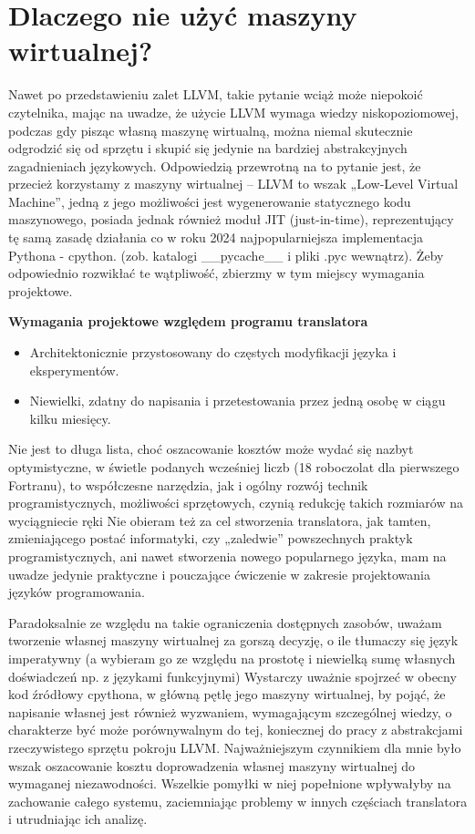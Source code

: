 \section{Dlaczego nie użyć maszyny wirtualnej?}
Nawet po przedstawieniu zalet LLVM, takie pytanie wciąż może niepokoić czytelnika, mając na uwadze, że użycie LLVM wymaga wiedzy niskopoziomowej, podczas gdy pisząc własną maszynę wirtualną, można niemal skutecznie odgrodzić się od sprzętu i skupić się jedynie na bardziej abstrakcyjnych zagadnieniach językowych. 
Odpowiedzią przewrotną na to pytanie jest, że przecież korzystamy z maszyny wirtualnej – LLVM to wszak „Low-Level Virtual Machine”, jedną z jego możliwości jest wygenerowanie statycznego kodu maszynowego, posiada jednak również moduł JIT (just-in-time), reprezentujący tę samą zasadę działania co w roku 2024 najpopularniejsza implementacja Pythona - cpython. (zob. katalogi \_\_pycache\_\_ i pliki .pyc wewnątrz). Żeby odpowiednio rozwikłać te wątpliwość, zbierzmy w tym miejscy wymagania projektowe.

\textbf{Wymagania projektowe względem programu translatora}
\begin{itemize}[noitemsep]
    \item Architektonicznie przystosowany do częstych modyfikacji języka i eksperymentów.%
    \item Niewielki, zdatny do napisania i przetestowania przez jedną osobę w ciągu kilku miesięcy.
\end{itemize}

Nie jest to długa lista, choć oszacowanie kosztów może wydać się nazbyt optymistyczne, w świetle podanych wcześniej liczb (18 roboczolat dla pierwszego Fortranu), to współczesne narzędzia, jak i ogólny rozwój technik programistycznych, możliwości sprzętowych, czynią redukcję takich rozmiarów na wyciągniecie ręki Nie obieram też za cel stworzenia translatora, jak tamten, zmieniającego postać informatyki, czy „zaledwie” powszechnych praktyk programistycznych, ani nawet stworzenia nowego popularnego języka, mam na uwadze jedynie praktyczne i pouczające ćwiczenie w zakresie projektowania języków programowania.

Paradoksalnie ze względu na takie ograniczenia dostępnych zasobów, uważam tworzenie własnej maszyny wirtualnej za gorszą decyzję, o ile tłumaczy się język imperatywny (a wybieram go ze względu na prostotę i niewielką sumę własnych doświadczeń np. z językami funkcyjnymi) Wystarczy uważnie spojrzeć w obecny kod źródłowy cpythona, w główną pętlę jego maszyny wirtualnej\cite{cpython_main_loop}, by pojąć, że napisanie własnej jest również wyzwaniem, wymagającym szczególnej wiedzy, o charakterze być może porównywalnym do tej, koniecznej do pracy z abstrakcjami rzeczywistego sprzętu pokroju LLVM. Najważniejszym czynnikiem dla mnie było wszak oszacowanie kosztu doprowadzenia własnej maszyny wirtualnej do wymaganej niezawodności. Wszelkie pomyłki w niej popełnione wpływałyby na zachowanie całego systemu, zaciemniając problemy w innych częściach translatora i utrudniając ich analizę. 

